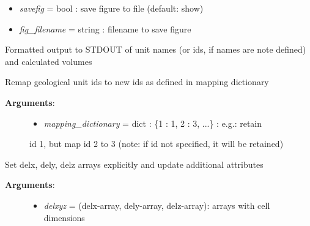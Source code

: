 \documentclass[letterpaper,10pt,english]{sphinxmanual}
\begin{document}
\begin{fulllineitems}
\begin{fulllineitems}
\begin{description}
\begin{itemize}
\item {} 
\emph{savefig} = bool : save figure to file (default: show)

\item {} 
\emph{fig\_filename} = string : filename to save figure

\end{itemize}

\end{description}

\end{fulllineitems}


\begin{fulllineitems}
\label{pygeomod:pygeomod.geogrid.GeoGrid.print_unit_names_volumes}
Formatted output to STDOUT of unit names (or ids, if names are note
defined) and calculated volumes

\end{fulllineitems}


\begin{fulllineitems}
\label{pygeomod:pygeomod.geogrid.GeoGrid.remap_ids}
Remap geological unit ids to new ids as defined in mapping dictionary
\begin{description}
\item[{\textbf{Arguments}:}] \leavevmode\begin{itemize}
\item {} 
\emph{mapping\_dictionary} = dict : \{1 : 1, 2 : 3, ...\} : e.g.: retain

\end{itemize}

id 1, but map id 2 to 3 (note: if id not specified, it will be retained)

\end{description}

\end{fulllineitems}


\begin{fulllineitems}
\label{pygeomod:pygeomod.geogrid.GeoGrid.set_delxyz}
Set delx, dely, delz arrays explicitly and update additional attributes
\begin{description}
\item[{\textbf{Arguments}:}] \leavevmode\begin{itemize}
\item {} 
\emph{delxyz} = (delx-array, dely-array, delz-array): arrays with cell dimensions


\end{itemize}
\end{description}
\end{fulllineitems}
\end{fulllineitems}
\end{document}
